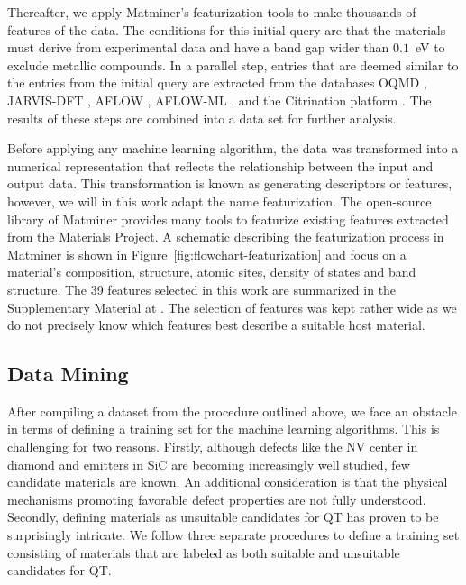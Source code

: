 \documentclass[superscriptaddress,unsortedaddress,
 amsmath,amssymb,
 aps,
]{revtex4-2}
\begin{document}




Thereafter, we apply Matminer’s \cite{Ward2018}
featurization tools to make thousands of features of the data. The conditions for this initial query are that the materials must derive from experimental data and have a band gap wider than $0.1$~eV to exclude metallic compounds. In a parallel step, entries that are deemed
similar to the entries from the initial query
are extracted from the databases OQMD \cite{Saal2013,Kirklin2015}, JARVIS-DFT \cite{Choudhary2020}, AFLOW \cite{Curtarolo2012, Curtarolo2012a, Calderon2015}, AFLOW-ML \cite{Isayev2017}, and the Citrination platform \cite{OMaraJordan2016MDIA}. The results of these steps are combined into a data set for further analysis. 

Before applying any machine learning algorithm, the data was transformed into a numerical representation that reflects the relationship between the input and output data. This transformation is known as generating descriptors
or features, however, we will in this work adapt the name featurization.
The open-source library of Matminer provides many tools to featurize existing features extracted from the Materials Project.
A schematic describing the  featurization process in Matminer is shown in Figure~\ref{fig:flowchart-featurization} 
and focus on a material's composition, structure, atomic sites, density of states and band structure. 
The 39 features selected in this work are summarized in the Supplementary Material at \cite{supplementary}. The selection of features was kept rather wide as we do not precisely know which features best describe a suitable  host material. 

\subsection*{Data Mining}

After compiling a dataset from the procedure outlined above, we face an obstacle in terms of defining a training set for the machine learning algorithms. This is challenging for two reasons. 
Firstly, although defects like the NV center in diamond and emitters in SiC are becoming
increasingly well studied, few candidate materials are known. An additional consideration
is that the physical mechanisms promoting favorable defect properties are not fully understood. Secondly, defining materials as unsuitable candidates for QT has proven to be surprisingly intricate. 
We follow three separate procedures to define a training set consisting of materials that are labeled as both suitable and unsuitable candidates for QT. 
\end{document}
